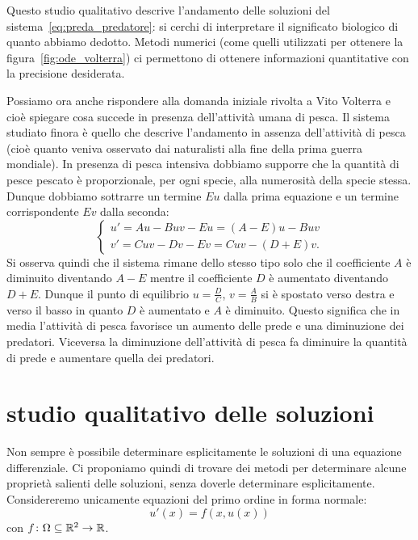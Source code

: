 Questo studio qualitativo descrive l'andamento delle soluzioni 
del sistema~\ref{eq:preda_predatore}: si cerchi di interpretare 
il significato biologico di quanto abbiamo dedotto. Metodi numerici 
(come quelli utilizzati per ottenere la figura~\ref{fig:ode_volterra})
ci permettono di ottenere informazioni quantitative con la precisione 
desiderata.

Possiamo ora anche rispondere alla domanda iniziale rivolta a Vito Volterra 
e cioè spiegare cosa succede in presenza dell'attività umana di pesca.
Il sistema studiato finora è quello che descrive l'andamento in assenza 
dell'attività di pesca (cioè quanto veniva osservato dai naturalisti alla fine della 
prima guerra mondiale). 
In presenza di pesca intensiva dobbiamo supporre che la quantità di pesce 
pescato è proporzionale, per ogni specie, alla numerosità della specie stessa.
Dunque dobbiamo sottrarre un termine $Eu$ dalla prima equazione e un termine 
corrispondente $Ev$ dalla seconda:
\begin{equation}
  \begin{cases}
    u' = A u - B u v - Eu = (A-E) u - B uv\\
    v' = C u v - D v - Ev = C uv - (D+E) v.
  \end{cases}
\end{equation}
Si osserva quindi che il sistema rimane dello stesso tipo solo che 
il coefficiente $A$ è diminuito diventando $A-E$ mentre il coefficiente 
$D$ è aumentato diventando $D+E$.
Dunque il punto di equilibrio $u=\frac DC$, $v=\frac AB$ si è spostato 
verso destra e verso il basso in quanto $D$ è aumentato e $A$ è diminuito.
Questo significa che in media l'attività di pesca favorisce un aumento 
delle prede e una diminuzione dei predatori. 
Viceversa la diminuzione dell'attività di pesca fa diminuire la quantità
di prede e aumentare quella dei predatori.

\section{studio qualitativo delle soluzioni}
\label{sec:studio_qualitativo_edo}

Non sempre è possibile determinare esplicitamente le soluzioni
di una equazione differenziale.
Ci proponiamo quindi di trovare dei metodi per
determinare alcune proprietà salienti delle soluzioni, senza
doverle determinare esplicitamente.
Considereremo unicamente equazioni del primo ordine in forma normale:
\begin{equation}\label{eqdiff}
	u'(x)= f(x,u(x))
\end{equation}
con $f\colon \Omega \subseteq {\mathbb R}^2\to {\mathbb R}$.

